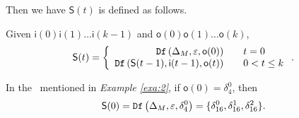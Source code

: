  Then we have $\mathsf{S}(t)$ is defined as follows. 
 \begin{definition}[$\mathsf{S}(t)$] Given $\mathsf{i}(0)\mathsf{i}(1)\ldots\mathsf{i}(k-1)$ and $\mathsf{o}(0)\mathsf{o}(1)\ldots\mathsf{o}(k)$, %
	\[\mathsf{S}(t)=\left\{
\begin{array}{rcl}
{\tt Df}\left(\Delta_M,\varepsilon,\mathsf{o}(0)\right)      &      & {t=0}\\
{\tt Df}\left(\mathsf{S}(t-1),\mathsf{i}(t-1),\mathsf{o}(t)\right)       &      & 0<t\leq k
\end{array} \right. .\]

\end{definition}
\begin{example}
In the \BCN\ mentioned in {\em Example \ref{exa:2}}, if $\mathsf{o}(0)=\delta_4^0$, then \[\mathsf{S}(0)={\tt Df}\left(\Delta_M,\varepsilon,\delta_4^0\right)=\{\delta_{16}^0,\delta_{16}^1,\delta_{16}^2\}.\]
 \label{exa:8}
 \end{example}   
 

 
 

